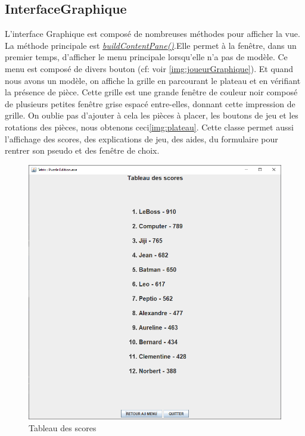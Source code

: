 		\subsection{InterfaceGraphique}
		L'interface Graphique est composé de nombreuses méthodes pour afficher la vue. La méthode principale est \underline{\textit{buildContentPane()}}.Elle permet à la fenêtre, dans un premier temps, d'afficher le menu principale lorsqu'elle n'a pas de modèle. Ce menu est composé de divers bouton (cf: voir \ref{img:joueurGraphique}). Et quand nous avons un modèle, on affiche la grille en parcourant le plateau et en vérifiant la présence de pièce. Cette grille est une grande fenêtre de couleur noir composé de plusieurs petites fenêtre grise espacé entre-elles, donnant cette impression de grille. On oublie pas d'ajouter à cela les pièces à placer, les boutons de jeu et les rotations des pièces, nous obtenons ceci\ref{img:plateau}.
        Cette classe permet aussi l'affichage des scores, des explications de jeu, des aides, du formulaire pour rentrer son pseudo et des fenêtre de choix.

        \begin{figure}[H]
            \centering
            \includegraphics[scale=0.1]{img/score.png}
            \caption{Tableau des scores}
        \end{figure}

